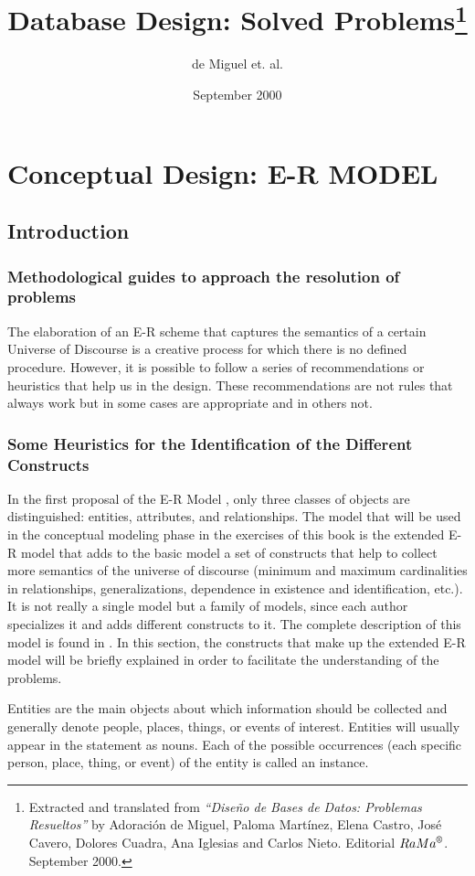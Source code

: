 \documentclass{article}
\title{Database Design: Solved Problems\footnote{Extracted and translated from \textit{``Diseño de Bases de Datos: Problemas Resueltos''} by Adoración de Miguel, Paloma Martínez, Elena Castro, José Cavero, Dolores Cuadra, Ana Iglesias and Carlos Nieto.  Editorial $RaMa^{\text{\textregistered}}$. September 2000.}}
\author{de Miguel et. al.}
\date{September 2000}
\numberwithin{figure}{section}
\begin{document}
\maketitle

\section{Conceptual Design: E-R MODEL}

\subsection{Introduction}

\subsubsection{
    Methodological guides to approach the resolution of problems
}

The elaboration of an E-R scheme that captures the semantics of a certain Universe of Discourse is a creative process for which there is no defined procedure.  However, it is possible to follow a series of recommendations or heuristics that help us in the design. These recommendations are not rules that always work but in some cases are appropriate and in others not.

\subsubsection{
    Some Heuristics for the Identification of the Different Constructs
}

In the first proposal of the E-R Model \cite{chen1976entity}, only three classes of objects are distinguished: entities, attributes, and relationships. The model that will be used in the conceptual modeling phase in the exercises of this book is the extended E-R model that adds to the basic model a set of constructs that help to collect more semantics of the universe of discourse (minimum and maximum cardinalities in relationships, generalizations, dependence in existence and identification, etc.).  It is not really a single model but a family of models, since each author specializes it and adds different constructs to it.  The complete description of this model is found in \cite{demiguel1999fundamentos}. In this section, the constructs that make up the extended E-R model will be briefly explained in order to facilitate the understanding of the problems.

Entities are the main objects about which information should be collected and generally denote people, places, things, or events of interest.  Entities will usually appear in the statement as nouns.  Each of the possible occurrences (each specific person, place, thing, or event) of the entity is called an instance.
\end{document}
